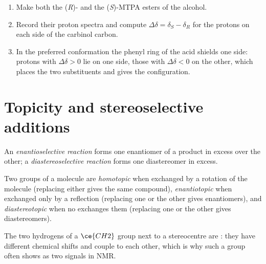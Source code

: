 \begin{method}\label{met:b3:asymmetric-synthesis:mosher}
\begin{enumerate}
  \item Make both the (\textit{R})- and the (\textit{S})-MTPA esters of the alcohol.
  \item Record their proton spectra and compute $\Delta\delta = \delta_S - \delta_R$ for the protons on each
        side of the carbinol carbon.
  \item In the preferred conformation the phenyl ring of the acid shields one side:
        protons with $\Delta\delta > 0$ lie on one side, those with $\Delta\delta < 0$ on the other, which
        places the two substituents and gives the configuration.
\end{enumerate}
\end{method}

\section{Topicity and stereoselective additions}

\begin{definition}\label{def:b3:asymmetric-synthesis:selective}
An \emph{enantioselective reaction} forms one
enantiomer of a product in excess over the other; a \emph{diastereoselective
reaction} forms one diastereomer in excess.
\end{definition}

\begin{definition}[Topicity]\label{def:b3:asymmetric-synthesis:topicity}
Two groups of a molecule are \emph{homotopic} when exchanged by
a rotation of the molecule (replacing either gives the same compound),
\emph{enantiotopic} when exchanged only by a reflection
(replacing one or the other gives enantiomers), and
\emph{diastereotopic} when no  exchanges
them (replacing one or the other gives diastereomers).
\end{definition}

The two hydrogens of a $\ce{CH2}$ group next to a stereocentre are : they
have different chemical shifts and couple to each other, which is why such a
group often shows as two signals in NMR.

